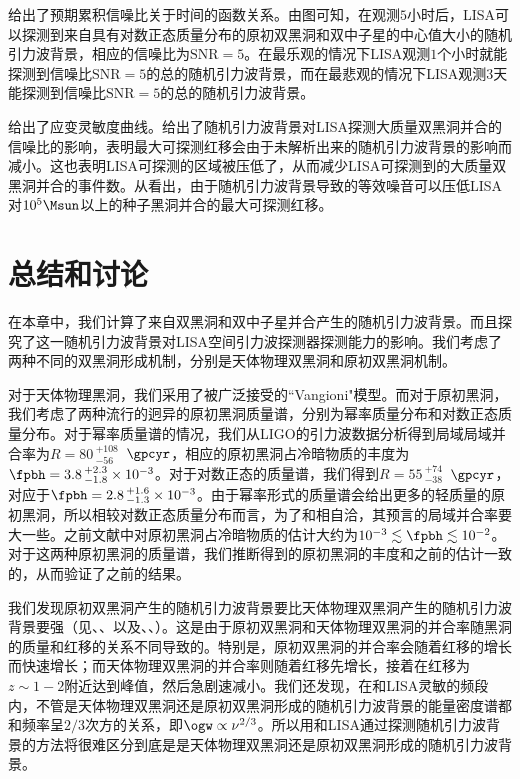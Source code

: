 给出了预期累积信噪比关于时间的函数关系。由图可知，在观测$5$小时后，LISA可以探测到来自具有对数正态质量分布的原初双黑洞和双中子星的中心值大小的随机引力波背景，相应的信噪比为$\mathrm{SNR} = 5$。在最乐观的情况下LISA观测$1$个小时就能探测到信噪比$\mathrm{SNR} = 5$的总的随机引力波背景，而在最悲观的情况下LISA观测$3$天能探测到信噪比$\mathrm{SNR} = 5$的总的随机引力波背景。

给出了应变灵敏度曲线。给出了随机引力波背景对LISA探测大质量双黑洞并合的信噪比的影响，表明最大可探测红移会由于未解析出来的随机引力波背景的影响而减小。这也表明LISA可探测的区域被压低了，从而减少LISA可探测到的大质量双黑洞并合的事件数。从看出，由于随机引力波背景导致的等效噪音可以压低LISA对$10^5 \Msun$以上的种子黑洞并合的最大可探测红移。



\section{总结和讨论}

在本章中，我们计算了来自双黑洞和双中子星并合产生的随机引力波背景。而且探究了这一随机引力波背景对LISA空间引力波探测器探测能力的影响。我们考虑了两种不同的双黑洞形成机制，分别是天体物理双黑洞和原初双黑洞机制。

对于天体物理黑洞，我们采用了被广泛接受的``Vangioni"模型\citep{Dvorkin:2016wac}。而对于原初黑洞，我们考虑了两种流行的迥异的原初黑洞质量谱，分别为幂率质量分布和对数正态质量分布。对于幂率质量谱的情况，我们从LIGO的引力波数据分析得到局域局域并合率为$R = 80\,^{+108}_{-56}$\, $\gpcyr$，相应的原初黑洞占冷暗物质的丰度为$\fpbh = 3.8\,^{+2.3}_{-1.8} \times 10^{-3}$。对于对数正态的质量谱，我们得到$R = 55\,^{+74}_{-38}$\, $\gpcyr$，对应于$\fpbh = 2.8\,^{+1.6}_{-1.3} \times 10^{-3}$。由于幂率形式的质量谱会给出更多的轻质量的原初黑洞，所以相较对数正态质量分布而言，为了和\lvc 相自洽，其预言的局域并合率要大一些。之前文献\citep{Sasaki:2016jop,Ali-Haimoud:2017rtz,Raidal:2017mfl,Kocsis:2017yty,Chen:2018czv}中对原初黑洞占冷暗物质的估计大约为$10^{-3} \lesssim \fpbh \lesssim 10^{-2}$。对于这两种原初黑洞的质量谱，我们推断得到的原初黑洞的丰度和之前的估计一致的，从而验证了之前的结果。

我们发现原初双黑洞产生的随机引力波背景要比天体物理双黑洞产生的随机引力波背景要强（见、、以及、、）。这是由于原初双黑洞和天体物理双黑洞的并合率随黑洞的质量和红移的关系不同导致的。特别是，原初双黑洞的并合率会随着红移的增长而快速增长；而天体物理双黑洞的并合率则随着红移先增长，接着在红移为$z \sim 1-2$附近达到峰值，然后急剧速减小。我们还发现，在\lvc 和LISA灵敏的频段内，不管是天体物理双黑洞还是原初双黑洞形成的随机引力波背景的能量密度谱都和频率呈$2/3$次方的关系，即$\ogw \propto \nu^{2/3}$。所以用\lvc 和LISA通过探测随机引力波背景的方法将很难区分到底是是天体物理双黑洞还是原初双黑洞形成的随机引力波背景。

